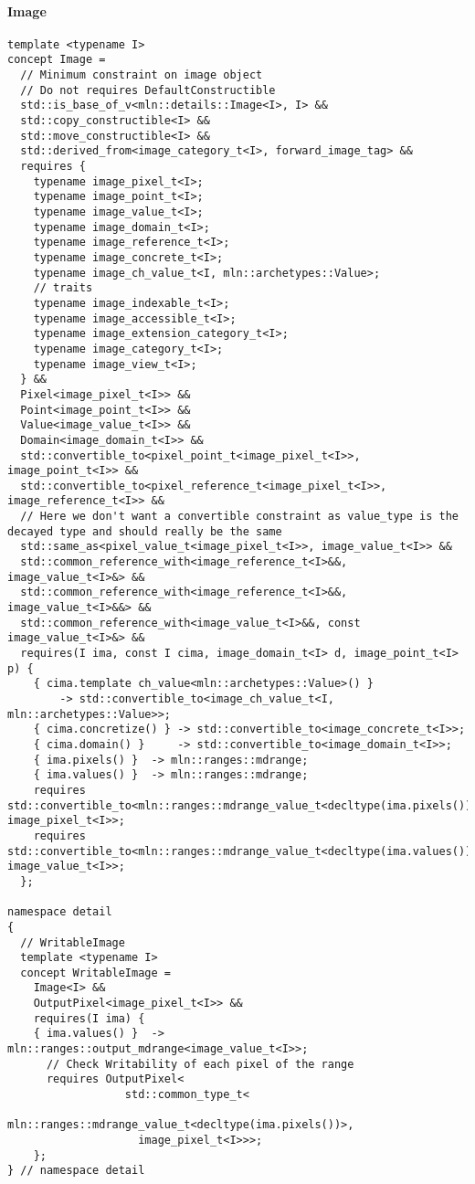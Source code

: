 \paragraph{Image}

\begin{verbatim}
template <typename I>
concept Image =
  // Minimum constraint on image object
  // Do not requires DefaultConstructible
  std::is_base_of_v<mln::details::Image<I>, I> &&
  std::copy_constructible<I> &&
  std::move_constructible<I> &&
  std::derived_from<image_category_t<I>, forward_image_tag> &&
  requires {
    typename image_pixel_t<I>;
    typename image_point_t<I>;
    typename image_value_t<I>;
    typename image_domain_t<I>;
    typename image_reference_t<I>;
    typename image_concrete_t<I>;
    typename image_ch_value_t<I, mln::archetypes::Value>;
    // traits
    typename image_indexable_t<I>;
    typename image_accessible_t<I>;
    typename image_extension_category_t<I>;
    typename image_category_t<I>;
    typename image_view_t<I>;
  } &&
  Pixel<image_pixel_t<I>> &&
  Point<image_point_t<I>> &&
  Value<image_value_t<I>> &&
  Domain<image_domain_t<I>> &&
  std::convertible_to<pixel_point_t<image_pixel_t<I>>, image_point_t<I>> &&
  std::convertible_to<pixel_reference_t<image_pixel_t<I>>, image_reference_t<I>> &&
  // Here we don't want a convertible constraint as value_type is the decayed type and should really be the same
  std::same_as<pixel_value_t<image_pixel_t<I>>, image_value_t<I>> &&
  std::common_reference_with<image_reference_t<I>&&, image_value_t<I>&> &&
  std::common_reference_with<image_reference_t<I>&&, image_value_t<I>&&> &&
  std::common_reference_with<image_value_t<I>&&, const image_value_t<I>&> &&
  requires(I ima, const I cima, image_domain_t<I> d, image_point_t<I> p) {
    { cima.template ch_value<mln::archetypes::Value>() }
        -> std::convertible_to<image_ch_value_t<I, mln::archetypes::Value>>;
    { cima.concretize() } -> std::convertible_to<image_concrete_t<I>>;
    { cima.domain() }     -> std::convertible_to<image_domain_t<I>>;
    { ima.pixels() }  -> mln::ranges::mdrange;
    { ima.values() }  -> mln::ranges::mdrange;
    requires std::convertible_to<mln::ranges::mdrange_value_t<decltype(ima.pixels())>, image_pixel_t<I>>;
    requires std::convertible_to<mln::ranges::mdrange_value_t<decltype(ima.values())>, image_value_t<I>>;
  };

namespace detail
{
  // WritableImage
  template <typename I>
  concept WritableImage =
    Image<I> &&
    OutputPixel<image_pixel_t<I>> &&
    requires(I ima) {
    { ima.values() }  -> mln::ranges::output_mdrange<image_value_t<I>>;
      // Check Writability of each pixel of the range
      requires OutputPixel<
                  std::common_type_t<
                    mln::ranges::mdrange_value_t<decltype(ima.pixels())>,
                    image_pixel_t<I>>>;
    };
} // namespace detail



\end{verbatim}
